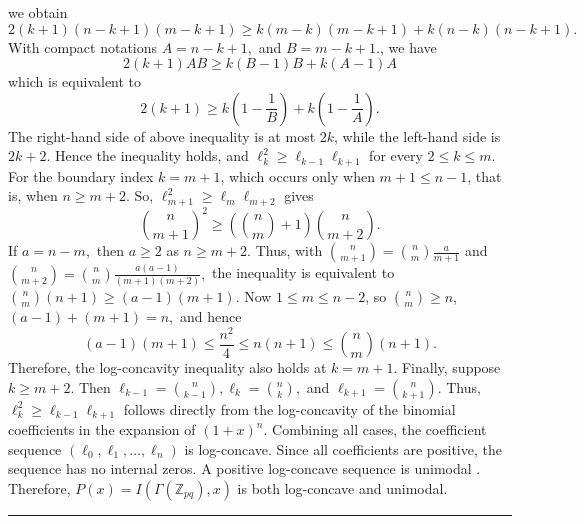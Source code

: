 \documentclass[12pt,twoside]{article}
\renewenvironment{proof}{{\noindent\bfseries Proof.}}{\qed}
\def\qed{\nolinebreak\hfill\rule{.2cm}{.2cm}\par\addvspace{.5cm}}
\begin{document}
\begin{proof}
 	we obtain
 	$$
 	2(k+1)(n-k+1)(m-k+1)
 	\geq
 	k(m-k)(m-k+1)+k(n-k)(n-k+1).
 	$$
 	With compact notations
 	$
 	A=n-k+1,$ and $ B=m-k+1.
 	$, we have
 	$$
 	2(k+1)AB\geq k(B-1)B+k(A-1)A
 	$$
 	which is equivalent to 
 	$$
 	2(k+1)\geq k\left(1-\frac{1}{B}\right)+k\left(1-\frac{1}{A}\right).
 	$$
 	The right-hand side of above inequality is at most $2k$, while the left-hand side is $2k+2$. Hence the inequality holds, and $
 	\ell_k^2\geq \ell_{k-1}\ell_{k+1}
 	$
 	for every $2\leq k\leq m$. For the boundary index $k=m+1$, which occurs only when $m+1\leq n-1$, that is, when $n\geq m+2$. So,  $ \ell_{m+1}^{2}\geq \ell_{m}\ell_{m+2}$ gives  
 	$$
 	\binom{n}{m+1}^2
 	\geq
 	\left(\binom{n}{m}+1\right)\binom{n}{m+2}.
 	$$
 	If $
 	a=n-m, $ then $a\geq 2$ as  $n\geq m+2$. Thus, with 
 	$
 	\binom{n}{m+1}
 	=
 	\binom{n}{m}\frac{a}{m+1}
 	$
 	and
 	$
 	\binom{n}{m+2}
 	=
 	\binom{n}{m}\frac{a(a-1)}{(m+1)(m+2)},
 	$
 	the  inequality is equivalent to
 	$
 	\binom{n}{m}(n+1)\geq (a-1)(m+1).
 	$
 	Now $1\leq m\leq n-2$, so $\binom{n}{m}\geq n$, $
 	(a-1)+(m+1)=n,
 	$
 	and hence
 	$$
 	(a-1)(m+1)\leq \frac{n^2}{4}\leq n(n+1)\leq \binom{n}{m}(n+1).
 	$$
 	Therefore, the log-concavity inequality also holds at $k=m+1$. Finally, suppose $k\geq m+2$. Then
 	$
 	\ell_{k-1}=\binom{n}{k-1},
 	\ell_k=\binom{n}{k},$ and $
 	\ell_{k+1}=\binom{n}{k+1}.
 	$
 	Thus,
 	$
 	\ell_k^2\geq \ell_{k-1}\ell_{k+1}
 	$
 	follows directly from the log-concavity of the binomial coefficients in the expansion of $(1+x)^n$.
 	 Combining all cases, the coefficient sequence
 	$
 	(\ell_0,\ell_1,\ldots,\ell_n)
 	$
 	is log-concave. Since all coefficients are positive, the sequence has no internal zeros. A positive log-concave sequence is unimodal \cite{stanley}. Therefore, $P(x)=I(\varGamma(\mathbb{Z}_{pq}),x)$ is both log-concave and unimodal.
 \end{proof} 
 
\end{document}
